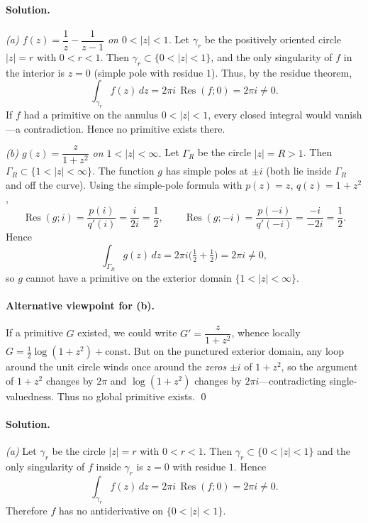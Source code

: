\documentclass[11pt,a4paper]{article}
\theoremstyle{definition}
\theoremstyle{definition}
\theoremstyle{plain}
\theoremstyle{remark}
\begin{document}
\paragraph{Solution.}

\emph{(a) $f(z)=\dfrac{1}{z}-\dfrac{1}{z-1}$ on $0<|z|<1$.}
Let $\gamma_r$ be the positively oriented circle $|z|=r$ with $0<r<1$. Then $\gamma_r\subset\{0<|z|<1\}$,
and the only singularity of $f$ in the interior is $z=0$ (simple pole with residue $1$). Thus, by the residue theorem,
\[
\int_{\gamma_r} f(z)\,dz
= 2\pi i\,\operatorname{Res}(f;0)
= 2\pi i \neq 0.
\]
If $f$ had a primitive on the annulus $0<|z|<1$, every closed integral would vanish—a contradiction. Hence no primitive exists there.

\medskip
\emph{(b) $g(z)=\dfrac{z}{1+z^{2}}$ on $1<|z|<\infty$.}
Let $\Gamma_R$ be the circle $|z|=R>1$. Then $\Gamma_R\subset\{1<|z|<\infty\}$.
The function $g$ has simple poles at $\pm i$ (both lie inside $\Gamma_R$ and off the curve).
Using the simple-pole formula with $p(z)=z$, $q(z)=1+z^2$,
\[
\operatorname{Res}(g;i)=\frac{p(i)}{q'(i)}=\frac{i}{2i}=\frac{1}{2},\qquad
\operatorname{Res}(g;-i)=\frac{p(-i)}{q'(-i)}=\frac{-i}{-2i}=\frac{1}{2}.
\]
Hence
\[
\int_{\Gamma_R} g(z)\,dz = 2\pi i\Big(\tfrac12+\tfrac12\Big)=2\pi i\neq 0,
\]
so $g$ cannot have a primitive on the exterior domain $\{1<|z|<\infty\}$.

\paragraph{Alternative viewpoint for (b).}
If a primitive $G$ existed, we could write $G'=\dfrac{z}{1+z^2}$, whence locally
\(
G=\tfrac12\log(1+z^2)+\text{const}.
\)
But on the punctured exterior domain, any loop around the unit circle winds once around the \emph{zeros} $\pm i$ of $1+z^2$, so the argument of $1+z^2$ changes by $2\pi$ and $\log(1+z^2)$ changes by $2\pi i$—contradicting single-valuedness. Thus no global primitive exists.
\qed


\paragraph{Solution.}

\emph{(a)} Let $\gamma_r$ be the circle $|z|=r$ with $0<r<1$.
Then $\gamma_r\subset\{0<|z|<1\}$ and the only singularity of $f$ inside $\gamma_r$
is $z=0$ with residue $1$. Hence
\[
\int_{\gamma_r} f(z)\,dz = 2\pi i\,\operatorname{Res}(f;0) = 2\pi i \neq 0.
\]
Therefore $f$ has no antiderivative on $\{0<|z|<1\}$.
\end{document}
